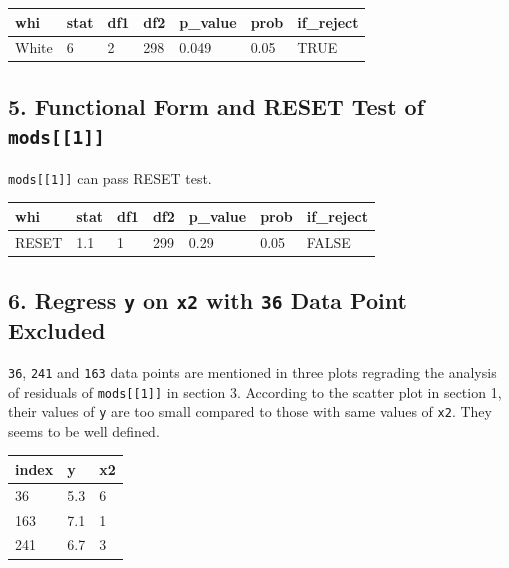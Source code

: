 \documentclass[a4paper]{article}
\begin{document}
\begin{table}[H]
\centering
\begin{tabular}{lllllll}
\toprule
whi & stat & df1 & df2 & p\_value & prob & if\_reject\\
\midrule
White & 6 & 2 & 298 & 0.049 & 0.05 & TRUE\\
\bottomrule
\end{tabular}
\end{table}

\hypertarget{functional-form-and-reset-test-of-mods1}{%
\subsection{\texorpdfstring{5. Functional Form and RESET Test of
\texttt{mods{[}{[}1{]}{]}}}{5. Functional Form and RESET Test of mods{[}{[}1{]}{]}}}\label{functional-form-and-reset-test-of-mods1}}

\texttt{mods{[}{[}1{]}{]}} can pass RESET test.

\begin{table}[H]
\centering
\begin{tabular}{lllllll}
\toprule
whi & stat & df1 & df2 & p\_value & prob & if\_reject\\
\midrule
RESET & 1.1 & 1 & 299 & 0.29 & 0.05 & FALSE\\
\bottomrule
\end{tabular}
\end{table}

\hypertarget{regress-y-on-x2-with-36-data-point-excluded}{%
\subsection{\texorpdfstring{6. Regress \texttt{y} on \texttt{x2} with
\texttt{36} Data Point
Excluded}{6. Regress y on x2 with 36 Data Point Excluded}}\label{regress-y-on-x2-with-36-data-point-excluded}}

\texttt{36}, \texttt{241} and \texttt{163} data points are mentioned in
three plots regrading the analysis of residuals of
\texttt{mods{[}{[}1{]}{]}} in section 3. According to the scatter plot
in section 1, their values of \texttt{y} are too small compared to those
with same values of \texttt{x2}. They seems to be well defined.

\begin{table}[H]
\centering
\begin{tabular}{lll}
\toprule
index & y & x2\\
\midrule
36 & 5.3 & 6\\
163 & 7.1 & 1\\
241 & 6.7 & 3\\
\bottomrule
\end{tabular}
\end{table}
\end{document}
